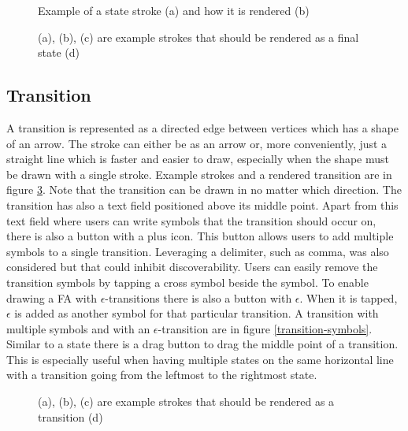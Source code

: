 \begin{figure}
    \centering
    \caption{Example of a state stroke (a) and how it is rendered (b)}\label{state}
\end{figure}

\begin{figure}
    \centering
    \caption{(a), (b), (c) are example strokes that should be rendered as a final state (d)}\label{final-state}
\end{figure}

\subsection{Transition}

A transition is represented as a directed edge between vertices which has a shape of an arrow. The stroke can either be as an arrow or, more conveniently, just a straight line which is faster and easier to draw, especially when the shape must be drawn with a single stroke. Example strokes and a rendered transition are in figure \ref{transition}. Note that the transition can be drawn in no matter which direction. The transition has also a text field positioned above its middle point. Apart from this text field where users can write symbols that the transition should occur on, there is also a button with a plus icon. This button allows users to add multiple symbols to a single transition. Leveraging a delimiter, such as comma, was also considered but that could inhibit discoverability. Users can easily remove the transition symbols by tapping a cross symbol beside the symbol. To enable drawing a FA with $\epsilon$-transitions there is also a button with $\epsilon$. When it is tapped, $\epsilon$ is added as another symbol for that particular transition. A transition with multiple symbols and with an $\epsilon$-transition are in figure \ref{transition-symbols}. Similar to a state there is a drag button to drag the middle point of a transition. This is especially useful when having multiple states on the same horizontal line with a transition going from the leftmost to the rightmost state.

\begin{figure}
    \centering
    \caption{(a), (b), (c) are example strokes that should be rendered as a transition (d)}\label{transition}
\end{figure}

